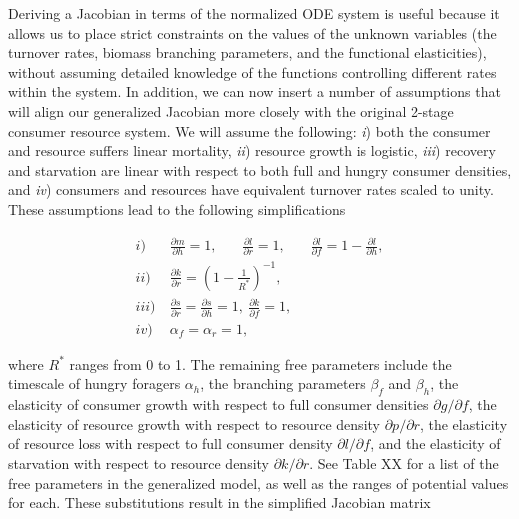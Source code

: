 \documentclass[12pt,english]{article}
\begin{document}
\begin{spacing}{1.9}
Deriving a Jacobian in terms of the normalized ODE system is useful because it allows us to place strict constraints on the values of the unknown variables (the turnover rates, biomass branching parameters, and the functional elasticities), without assuming detailed knowledge of the functions controlling different rates within the system. %
In addition, we can now insert a number of assumptions that will align our generalized Jacobian more closely with the original 2-stage consumer resource system.
We will assume the following:
\emph{i}) both the consumer and resource suffers linear mortality,
\emph{ii}) resource growth is logistic,
\emph{iii}) recovery and starvation are linear with respect to both full and hungry consumer densities, and
\emph{iv}) consumers and resources have equivalent turnover rates scaled to unity.
These assumptions lead to the following simplifications

\begin{align}
	i)~&\frac{\partial m}{\partial h} = 1, ~~~~~~~~ \frac{\partial l}{\partial r} = 1, ~~~~~~~~ \frac{\partial l}{\partial f} = 1 - \frac{\partial l}{\partial h}, \nonumber \\
	ii)~&\frac{\partial k}{\partial r} = \left(1 - \frac{1}{R^*} \right)^{-1}, \nonumber \\
	iii)~&\frac{\partial s}{\partial r} = \frac{\partial s}{\partial h} = 1, ~ \frac{\partial k}{\partial f} = 1, \nonumber \\
	iv)~&\alpha_f = \alpha_r = 1,
\end{align}

\noindent where $R^*$ ranges from 0 to 1.
The remaining free parameters include the timescale of hungry foragers $\alpha_h$, the branching parameters $\beta_f$ and $\beta_h$, the elasticity of consumer growth with respect to full consumer densities $\partial g / \partial f$, the elasticity of resource growth with respect to resource density $\partial p / \partial r$, the elasticity of resource loss with respect to full consumer density $\partial l / \partial f$, and the elasticity of starvation with respect to resource density $\partial k / \partial r$.
See Table XX for a list of the free parameters in the generalized model, as well as the ranges of potential values for each.
These substitutions result in the simplified Jacobian matrix


\end{spacing}
\end{document}

